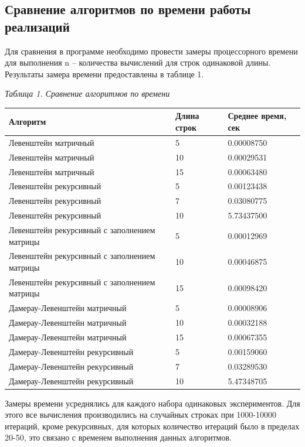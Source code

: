 \documentclass[a4paper,12pt]{article}
\begin{document}
\clearpage

\subsection{Сравнение алгоритмов по времени работы реализаций}%

Для сравнения в программе необходимо провести замеры процессорного времени для выполнения n – количества вычислений для строк одинаковой длины. Результаты замера времени предоставлены в таблице 1.

\begin{center}
	\textit{Таблица 1. Сравнение алгоритмов по времени}
\end{center}

\begin{tabular}{ | l | l | l | } \hline
	Алгоритм & Длина строк & Среднее время, сек  \\ \hline
	Левенштейн матричный & 5 & 0.00008750 \\
	Левенштейн матричный & 10 & 0.00029531 \\
	Левенштейн матричный & 15 & 0.00063480 \\
	Левенштейн рекурсивный & 5 & 0.00123438 \\
	Левенштейн рекурсивный & 7 & 0.03080775 \\
	Левенштейн рекурсивный & 10 & 5.73437500 \\
	Левенштейн рекурсивный с заполнением матрицы & 5  & 0.00012969 \\
	Левенштейн рекурсивный с заполнением матрицы & 10 & 0.00046875 \\
	Левенштейн рекурсивный с заполнением матрицы & 15 & 0.00098420 \\
	Дамерау-Левенштейн матричный & 5 & 0.00008906 \\
	Дамерау-Левенштейн матричный & 10 & 0.00032188 \\
	Дамерау-Левенштейн матричный & 15 & 0.00067355 \\ 
	Дамерау-Левенштейн рекурсивный & 5 & 0.00159060 \\
	Дамерау-Левенштейн рекурсивный & 7 & 0.03289530 \\
	Дамерау-Левенштейн рекурсивный & 10 & 5.47348705 \\ \hline
\end{tabular}

\vspace{\baselineskip}

Замеры времени усреднялись для каждого набора одинаковых экспериментов. Для этого все вычисления производились на случайных строках при 1000-10000 итераций, кроме рекурсивных, для которых количество итераций было в пределах 20-50, это связано с временем выполнения данных алгоритмов.
\end{document}
